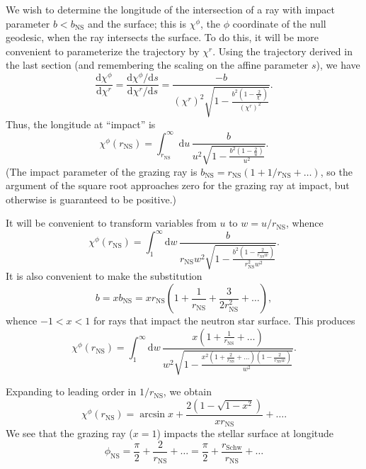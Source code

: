 \documentclass[modern]{aastex631}
\newcommand{\dd}{\mathrm{d}}
\newcommand{\bNS}{b_\mathrm{NS}}
\newcommand{\phiNS}{\phi_\mathrm{NS}}
\newcommand{\rNS}{r_\mathrm{NS}}
\newcommand{\rSchw}{r_\mathrm{Schw}}
\begin{document}
We wish to determine the longitude of the intersection of a ray with impact
parameter $b < \bNS$ and the surface; this is $\chi^\phi$, the $\phi$ coordinate
of the null geodesic, when the ray intersects the surface.  To do this, it will
be more convenient to parameterize the trajectory by $\chi^r$. Using the
trajectory derived in the last section (and remembering the scaling on the
affine parameter $s$), we have 
\begin{equation}
\frac{\dd \chi^\phi}{\dd \chi^r} = \frac{\dd \chi^\phi/\dd s}{\dd \chi^r/\dd s} = \frac{-b}{(\chi^r)^2 \sqrt{1 - \frac{b^2 \left(1 - \frac{2}{\chi^r} \right)}{(\chi^r)^2}}}.
\end{equation}
Thus, the longitude at ``impact'' is 
\begin{equation}
\chi^\phi\left( \rNS \right) = \int_{\rNS}^{\infty} \dd u \, \frac{b}{u^2 \sqrt{1 - \frac{b^2\left(1 - \frac{2}{u} \right)}{u^2 }}}.
\end{equation}
(The impact parameter of the grazing ray is $\bNS = \rNS\left( 1 + 1/\rNS +
\ldots \right)$, so the argument of the square root approaches zero for the
grazing ray at impact, but otherwise is guaranteed to be positive.)

It will be convenient to transform variables from $u$ to $w = u/\rNS$, whence 
\begin{equation}
    \label{eq:w-substitution}
    \chi^\phi\left( \rNS \right) = \int_{1}^{\infty} \dd w \, \frac{b}{\rNS w^2 \sqrt{1 - \frac{b^2\left(1 - \frac{2}{\rNS w} \right)}{\rNS^2 w^2}}}.
\end{equation}
It is also convenient to make the substitution 
\begin{equation}
    b = x \bNS = x \rNS \left( 1 + \frac{1}{\rNS} + \frac{3}{2 \rNS^2} + \ldots \right),
\end{equation}
whence $-1 < x < 1$ for rays that impact the neutron star surface. This produces 
\begin{equation}
    \chi^\phi\left( \rNS \right) = \int_1^\infty \dd w \, \frac{x \left( 1 + \frac{1}{\rNS} + \ldots \right)}{w^2 \sqrt{1 - \frac{x^2 \left( 1 + \frac{2}{\rNS} + \ldots \right)\left( 1 - \frac{2}{\rNS w} \right)}{w^2}}}.
\end{equation}

Expanding to leading order in $1/\rNS$, we obtain 
\begin{equation}
    \label{eq:chi-phi-impact}
    \chi^\phi\left( \rNS \right) = \arcsin x + \frac{2 \left( 1 - \sqrt{1-x^2} \right)}{x \rNS} + \ldots.
\end{equation}
We see that the grazing ray ($x = 1$) impacts the stellar surface at longitude 
\begin{equation}
    \phiNS = \frac{\pi}{2} + \frac{2}{\rNS} + \ldots = \frac{\pi}{2} + \frac{\rSchw}{\rNS} + \ldots
\end{equation}
\end{document}
